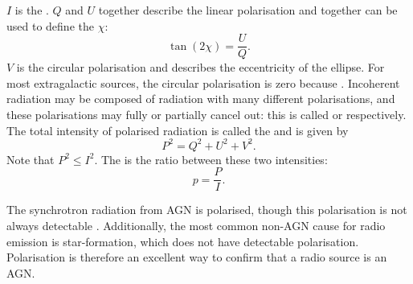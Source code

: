         $I$ is the . $Q$ and $U$ together describe the linear polarisation and together can be used to define the  $\chi$:
        \begin{equation}
            \label{eq:polarisation-angle}
            \tan (2 \chi) = \frac{U}{Q}.
        \end{equation}
        $V$ is the circular polarisation and describes the eccentricity of the ellipse. For most extragalactic sources, the circular polarisation is zero \citeneeded because . Incoherent radiation may be composed of radiation with many different polarisations, and these polarisations may fully or partially cancel out: this is called  or  respectively. The total intensity of polarised radiation is called the  and is given by
        \begin{equation}
            \label{eq:polarised-intensity}
            P^2 = Q^2 + U^2 + V^2.
        \end{equation}
        Note that $P^2 \leq I^2$. The  is the ratio between these two intensities:
        \begin{equation}
            p = \frac{P}{I}.
        \end{equation}

        The synchrotron radiation from AGN is polarised, though this polarisation is not always detectable \citeneeded {}. Additionally, the most common non-AGN cause for radio emission is star-formation, which does not have detectable polarisation. Polarisation is therefore an excellent way to confirm that a radio source is an AGN.

